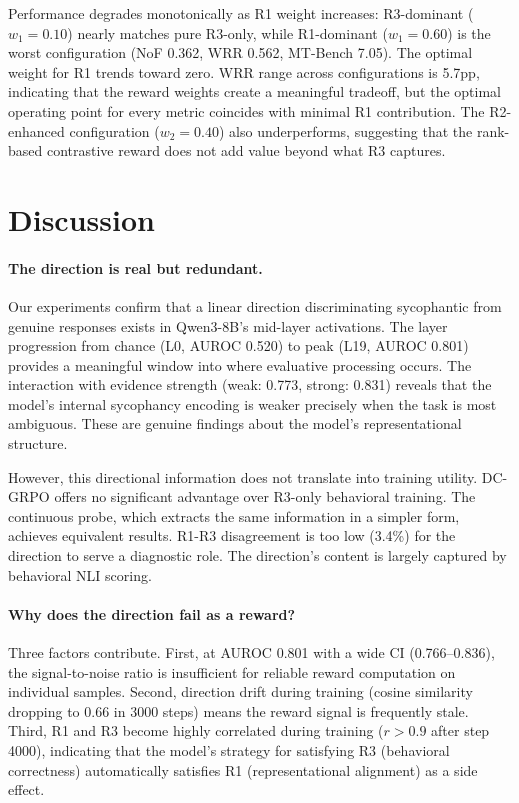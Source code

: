 \documentclass[11pt,a4paper]{article}
\begin{document}
Performance degrades monotonically as R1 weight increases: R3-dominant ($w_1 = 0.10$) nearly matches pure R3-only, while R1-dominant ($w_1 = 0.60$) is the worst configuration (NoF 0.362, WRR 0.562, MT-Bench 7.05). The optimal weight for R1 trends toward zero. WRR range across configurations is 5.7pp, indicating that the reward weights create a meaningful tradeoff, but the optimal operating point for every metric coincides with minimal R1 contribution. The R2-enhanced configuration ($w_2 = 0.40$) also underperforms, suggesting that the rank-based contrastive reward does not add value beyond what R3 captures.

\section{Discussion}

\paragraph{The direction is real but redundant.}
Our experiments confirm that a linear direction discriminating sycophantic from genuine responses exists in Qwen3-8B's mid-layer activations. The layer progression from chance (L0, AUROC 0.520) to peak (L19, AUROC 0.801) provides a meaningful window into where evaluative processing occurs. The interaction with evidence strength (weak: 0.773, strong: 0.831) reveals that the model's internal sycophancy encoding is weaker precisely when the task is most ambiguous. These are genuine findings about the model's representational structure.

However, this directional information does not translate into training utility. DC-GRPO offers no significant advantage over R3-only behavioral training. The continuous probe, which extracts the same information in a simpler form, achieves equivalent results. R1-R3 disagreement is too low (3.4\%) for the direction to serve a diagnostic role. The direction's content is largely captured by behavioral NLI scoring.

\paragraph{Why does the direction fail as a reward?}
Three factors contribute. First, at AUROC 0.801 with a wide CI (0.766--0.836), the signal-to-noise ratio is insufficient for reliable reward computation on individual samples. Second, direction drift during training (cosine similarity dropping to 0.66 in 3000 steps) means the reward signal is frequently stale. Third, R1 and R3 become highly correlated during training ($r > 0.9$ after step 4000), indicating that the model's strategy for satisfying R3 (behavioral correctness) automatically satisfies R1 (representational alignment) as a side effect.
\end{document}
